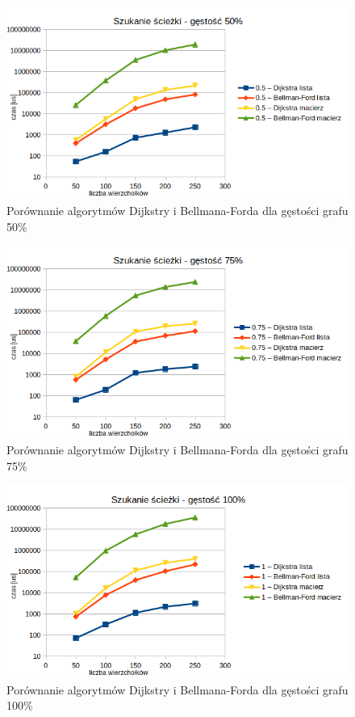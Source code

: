 \documentclass[11pt]{article}
\begin{document}
\begin{figure}[H]
    \includegraphics[width=13cm]{images/db50.png}
    \caption{ Porównanie algorytmów Dijkstry i Bellmana-Forda dla gęstości grafu 50\%}
\end{figure}

\begin{figure}[H]
    \includegraphics[width=13cm]{images/db75.png}
    \caption{ Porównanie algorytmów Dijkstry i Bellmana-Forda dla gęstości grafu 75\%}
\end{figure}

\begin{figure}[H]
    \includegraphics[width=13cm]{images/db100.png}
    \caption{ Porównanie algorytmów Dijkstry i Bellmana-Forda dla gęstości grafu 100\%}
\end{figure}
\end{document}
